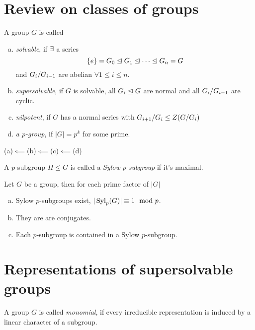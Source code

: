 \documentclass[a4paper]{article}
\begin{document}
\section{Review on classes of groups}
\begin{defi}
  A group $G$ is called
  \begin{enumerate}[(a)]
    \item \emph{solvable}, if $\exists$ a series
          \[\{e\} = G_{0} \trianglelefteq G_{1} \trianglelefteq \cdots \trianglelefteq G_{n} = G\]
          and $\fak {G_{i}}{G_{i-1}}$ are abelian $\forall 1 \le i \le n$.
    \item \emph{supersolvable}, if $G$ is solvable, all $G_{i} \trianglelefteq G$ are normal and all $\fak {G_{i}}{G_{i-1}}$ are cyclic.
    \item \emph{nilpotent}, if $G$ has a normal series with $\fak{G_{i+1}}{G_{i}} \le Z(\fak{G}{G_{i}})$
    \item \emph{a $p$-group}, if $|G| = p^{k}$ for some prime.
  \end{enumerate}
\end{defi}
\begin{rem}
(a)$\impliedby$(b)$\impliedby$(c)$\impliedby$(d)
\end{rem}
\begin{defi}
A $p$-subgroup $H \le G$ is called a \emph{Sylow $p$-subgroup} if it's maximal.
\end{defi}

\begin{thm}[Sylow]
  Let $G$ be a group, then for each prime factor of $|G|$
  \begin{enumerate}[(a)]
    \item Sylow $p$-subgroups exist, $|\operatorname{Syl}_{p}(G)| \equiv 1 \mod p$.
    \item They are are conjugates.
    \item Each $p$-subgroup is contained in a Sylow $p$-subgroup.
  \end{enumerate}

\end{thm}
\section{Representations of supersolvable groups}

\begin{defi}
A group $G$ is called \emph{monomial}, if every irreducible representation is induced by a linear character of a subgroup.
\end{defi}
\end{document}
